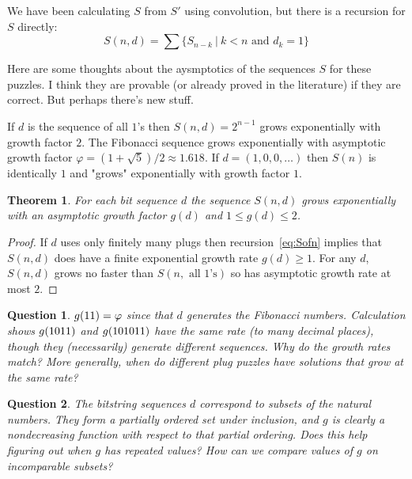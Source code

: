 \documentclass[10pt]{article}
\newtheorem{theorem}{Theorem}
\newtheorem{question}{Question}
\numberwithin{equation}{section}
\newenvironment{anote}
               {{\textcolor{blue}{Note:}}
                 \itshape
               }
               {}
\newcommand{\plug}[1]{%
\mbox{{\textbf\texttt #1}}
}
\begin{document}
We have been calculating $S$ from $S'$ using convolution, but there is a recursion for $S$ directly:
\begin{equation}\label{eq:Sofn}
    S(n,d) = \sum\{S_{n-k} \ | \ k < n \text{ and } d_k = 1\}
\end{equation}

\begin{anote}
 Here are some thoughts about the aysmptotics of the sequences $S$ for these puzzles. I think they are provable (or already proved in the literature) if they are correct. But perhaps there's new stuff.
\end{anote}

If $d$ is the sequence of all $1$'s then $S(n,d) = 2^{n-1}$ grows exponentially with growth factor $2$. The Fibonacci sequence grows exponentially with asymptotic growth factor $\varphi = (1+ \sqrt{5})/2 \approx 1.618$. If $d = (1, 0, 0,  \ldots)$ then $S(n)$ is identically $1$ and "grows" exponentially with growth factor $1$.

\begin{theorem}
For each bit sequence $d$ the  sequence $S(n,d)$ grows exponentially with an asymptotic growth factor $g(d)$ and  $1 \le g(d) \le 2$.
\end{theorem}
\begin{proof}
If $d$  uses only finitely many plugs then  recursion~\ref{eq:Sofn} implies that $S(n,d)$ does have a finite exponential growth rate $g(d) \ge 1$. For any $d$, $S(n,d)$ grows no faster than $S(n, \text{ all 1's})$ so has asymptotic growth rate at most $2$.
\end{proof}

\begin{question}
$g(\plug{11})= \varphi$ since that $d$ generates the Fibonacci numbers. Calculation shows $g(\plug{1011})$ and $g(\plug{101011})$ have the same rate (to many decimal places), though they (necessarily) generate different sequences. Why do the growth rates match? More generally, when do different plug puzzles have solutions that grow at the same rate?
\end{question}

\begin{question}
The bitstring sequences $d$ correspond to subsets of the natural numbers. They form a partially ordered set under inclusion, and $g$ is clearly a nondecreasing function with respect to that partial ordering.  Does this help figuring out when $g$ has repeated values? How can we compare values of $g$ on incomparable subsets?
\end{question}
 
\end{document}
